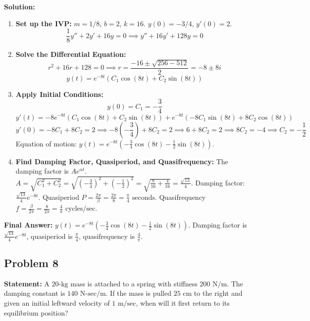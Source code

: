 \documentclass[11pt]{article}
\begin{document}
\textbf{Solution:}
\begin{enumerate}
    \item \textbf{Set up the IVP:}
    $m = 1/8$, $b = 2$, $k = 16$. $y(0) = -3/4$, $y'(0) = 2$.
    \[ \frac{1}{8}y'' + 2y' + 16y = 0 \implies y'' + 16y' + 128y = 0 \]
    
    \item \textbf{Solve the Differential Equation:}
    \[ r^2 + 16r + 128 = 0 \implies r = \frac{-16 \pm \sqrt{256 - 512}}{2} = -8 \pm 8i \]
    \[ y(t) = e^{-8t}(C_1 \cos(8t) + C_2 \sin(8t)) \]
    
    \item \textbf{Apply Initial Conditions:}
    \[ y(0) = C_1 = -\frac{3}{4} \]
    \[ y'(t) = -8e^{-8t}(C_1 \cos(8t) + C_2 \sin(8t)) + e^{-8t}(-8C_1 \sin(8t) + 8C_2 \cos(8t)) \]
    \[ y'(0) = -8C_1 + 8C_2 = 2 \implies -8\left(-\frac{3}{4}\right) + 8C_2 = 2 \implies 6 + 8C_2 = 2 \implies 8C_2 = -4 \implies C_2 = -\frac{1}{2} \]
    Equation of motion: $y(t) = e^{-8t}\left(-\frac{3}{4} \cos(8t) - \frac{1}{2} \sin(8t)\right)$.
    
    \item \textbf{Find Damping Factor, Quasiperiod, and Quasifrequency:}
    The damping factor is $A e^{\alpha t}$.
    $A = \sqrt{C_1^2 + C_2^2} = \sqrt{\left(-\frac{3}{4}\right)^2 + \left(-\frac{1}{2}\right)^2} = \sqrt{\frac{9}{16} + \frac{4}{16}} = \frac{\sqrt{13}}{4}$.
    Damping factor: $\frac{\sqrt{13}}{4} e^{-8t}$.
    Quasiperiod $P = \frac{2\pi}{\beta} = \frac{2\pi}{8} = \frac{\pi}{4} \text{ seconds}$.
    Quasifrequency $f = \frac{\beta}{2\pi} = \frac{8}{2\pi} = \frac{4}{\pi} \text{ cycles/sec}$.
\end{enumerate}
\textbf{Final Answer:} $y(t) = e^{-8t}\left(-\frac{3}{4} \cos(8t) - \frac{1}{2} \sin(8t)\right)$. Damping factor is $\frac{\sqrt{13}}{4} e^{-8t}$, quasiperiod is $\frac{\pi}{4}$, quasifrequency is $\frac{4}{\pi}$.

\subsection{Problem 8}
\textbf{Statement:} A $20\text{-kg}$ mass is attached to a spring with stiffness $200 \text{ N/m}$. The damping constant is $140 \text{ N-sec/m}$. If the mass is pulled $25 \text{ cm}$ to the right and given an initial leftward velocity of $1 \text{ m/sec}$, when will it first return to its equilibrium position?
\end{document}

